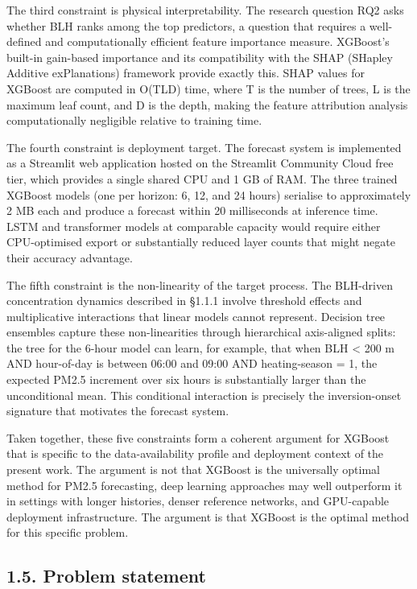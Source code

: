 The third constraint is physical interpretability. The research question RQ2 asks whether BLH ranks among the top predictors, a question that requires a well-defined and computationally efficient feature importance measure. XGBoost's built-in gain-based importance and its compatibility with the SHAP (SHapley Additive exPlanations) framework \cite{lundberg2017shap} provide exactly this. SHAP values for XGBoost are computed in O(TLD) time, where T is the number of trees, L is the maximum leaf count, and D is the depth, making the feature attribution analysis computationally negligible relative to training time.

The fourth constraint is deployment target. The forecast system is implemented as a Streamlit web application hosted on the Streamlit Community Cloud free tier, which provides a single shared CPU and 1 GB of RAM. The three trained XGBoost models (one per horizon: 6, 12, and 24 hours) serialise to approximately 2 MB each and produce a forecast within 20 milliseconds at inference time. LSTM and transformer models at comparable capacity would require either CPU-optimised export or substantially reduced layer counts that might negate their accuracy advantage.

The fifth constraint is the non-linearity of the target process. The BLH-driven concentration dynamics described in §1.1.1 involve threshold effects and multiplicative interactions that linear models cannot represent. Decision tree ensembles capture these non-linearities through hierarchical axis-aligned splits: the tree for the 6-hour model can learn, for example, that when BLH \textless{} 200 m AND hour-of-day is between 06:00 and 09:00 AND heating-season = 1, the expected PM2.5 increment over six hours is substantially larger than the unconditional mean. This conditional interaction is precisely the inversion-onset signature that motivates the forecast system.

Taken together, these five constraints form a coherent argument for XGBoost that is specific to the data-availability profile and deployment context of the present work. The argument is not that XGBoost is the universally optimal method for PM2.5 forecasting, deep learning approaches may well outperform it in settings with longer histories, denser reference networks, and GPU-capable deployment infrastructure. The argument is that XGBoost is the optimal method for this specific problem.

\subsection{1.5. Problem statement}\label{problem-statement}

